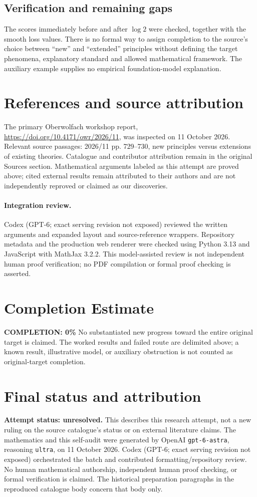 \documentclass[11pt]{article}
\begin{document}
\subsection{Verification and remaining gaps}
The scores immediately before and after $\log2$ were checked, together with the smooth loss values. There is no formal way to assign completion to the source's choice between ``new'' and ``extended'' principles without defining the target phenomena, explanatory standard and allowed mathematical framework. The auxiliary example supplies no empirical foundation-model explanation.

\section{References and source attribution}
The primary Oberwolfach workshop report, \url{https://doi.org/10.4171/owr/2026/11}, was inspected on 11 October 2026. Relevant source passages: 2026/11 pp. 729--730, new principles versus extensions of existing theories. Catalogue and contributor attribution remain in the original Sources section. Mathematical arguments labeled as this attempt are proved above; cited external results remain attributed to their authors and are not independently reproved or claimed as our discoveries.


\paragraph{Integration review.} Codex (GPT-6; exact serving revision not exposed) reviewed the written arguments and expanded layout and source-reference wrappers. Repository metadata and the production web renderer were checked using Python 3.13 and JavaScript with MathJax 3.2.2. This model-assisted review is not independent human proof verification; no PDF compilation or formal proof checking is asserted.

\section{Completion Estimate}
\noindent\textbf{COMPLETION: 0\%}
No substantiated new progress toward the entire original target is claimed. The worked results and failed route are delimited above; a known result, illustrative model, or auxiliary obstruction is not counted as original-target completion.

\section{Final status and attribution}
\textbf{Attempt status: unresolved.} This describes this research attempt, not a new ruling on the source catalogue's status or on external literature claims.
The mathematics and this self-audit were generated by OpenAI \texttt{gpt-6-astra}, reasoning \texttt{ultra}, on 11 October 2026. Codex (GPT-6; exact serving revision not exposed) orchestrated the batch and contributed formatting/repository review. No human mathematical authorship, independent human proof checking, or formal verification is claimed. The historical preparation paragraphs in the reproduced catalogue body concern that body only.
\end{document}

